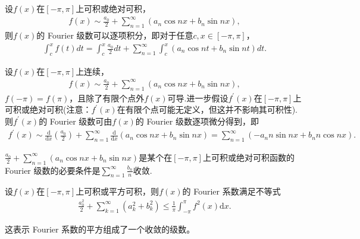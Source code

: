 \documentclass[../../main.tex]{subfiles}
\begin{document}
\begin{theorem}[Fourier级数的逐项积分定理]\label{theorem:Fourier级数的逐项积分定理}
设$f(x)$在$[-\pi,\pi]$上可积或绝对可积，
\begin{align*}
f(x)\sim\frac{a_0}{2}+\sum_{n = 1}^{\infty}(a_n\cos nx + b_n\sin nx),
\end{align*}
则$f(x)$的 Fourier 级数可以逐项积分，即对于任意$c,x\in[-\pi,\pi]$，
\begin{align*}
\int_{c}^{x}f(t)dt=\int_{c}^{x}\frac{a_0}{2}dt+\sum_{n = 1}^{\infty}\int_{c}^{x}(a_n\cos nt + b_n\sin nt)dt.
\end{align*}
\end{theorem}

\begin{theorem}[Fourier级数的逐项微分定理]\label{theorem:Fourier级数的逐项微分定理}
设$f(x)$在$[-\pi,\pi]$上连续，
\begin{align*}
f(x)\sim\frac{a_0}{2}+\sum_{n = 1}^{\infty}(a_n\cos nx + b_n\sin nx),
\end{align*}
$f(-\pi)=f(\pi)$，且除了有限个点外$f(x)$可导.进一步假设$f^{\prime}(x)$在$[-\pi,\pi]$上可积或绝对可积(注意：$f^{\prime}(x)$在有限个点可能无定义，但这并不影响其可积性). 则$f^{\prime}(x)$的 Fourier 级数可由$f(x)$的 Fourier 级数逐项微分得到，即
\begin{align*}
f^{\prime}(x)\sim\frac{\mathrm{d}}{\mathrm{d}x}\left(\frac{a_0}{2}\right)+\sum_{n = 1}^{\infty}\frac{\mathrm{d}}{\mathrm{d}x}(a_n\cos nx + b_n\sin nx)=\sum_{n = 1}^{\infty}(-a_nn\sin nx + b_nn\cos nx).
\end{align*}
\end{theorem}

\begin{corollary}
$\frac{a_0}{2}+\sum_{n = 1}^{\infty}(a_n\cos nx + b_n\sin nx)$是某个在$[-\pi,\pi]$上可积或绝对可积函数的 Fourier 级数的必要条件是$\sum_{n = 1}^{\infty}\frac{b_n}{n}$收敛. 
\end{corollary}

\begin{theorem}[Bessel不等式]\label{theorem:Bessel不等式}
设$f(x)$在$[-\pi,\pi]$上可积或平方可积，则$f(x)$的 Fourier 系数满足不等式
\begin{align*}
\frac{a_0^2}{2}+\sum_{k = 1}^{\infty}(a_k^2 + b_k^2)\leq\frac{1}{\pi}\int_{-\pi}^{\pi}f^2(x)\mathrm{d}x.
\end{align*}
\end{theorem}
\begin{note}
这表示 Fourier 系数的平方组成了一个收敛的级数。
\end{note}
\end{document}
